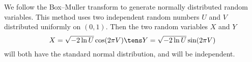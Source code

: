 We follow the Box–Muller transform to generate normally distributed random variables. This method uses two independent random numbers $U$ and $V$ distributed uniformly on $(0,1)$. Then the two random variables $X$ and $Y$ 
$$ X = \sqrt{-2\ln U} \cos(2\pi V) \tens Y = \sqrt{-2\ln U} \sin(2\pi V) $$
will both have the standard normal distribution, and will be independent. %

